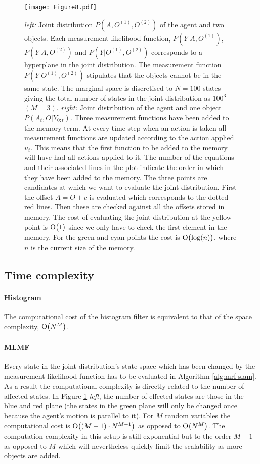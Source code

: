 \documentclass[review]{elsarticle}
\numberwithin{equation}{section}
\begin{document}
\begin{figure}
 \centering
  \texttt{[image: Figure8.pdf]}
  \caption{\textit{left:} Joint distribution $P(A,O^{(1)},O^{(2)})$ of the agent and two objects. Each measurement likelihood function, $P(Y|A,O^{(1)})$, 
  $P(Y|A,O^{(2)})$ and $P(Y|O^{(1)},O^{(2)})$ corresponds to a hyperplane in the joint distribution. The measurement function $P(Y|O^{(1)},O^{(2)})$ 
  stipulates that the objects cannot be in the same state. The marginal space is discretised to $N = 100$ states giving the total number of states in 
  the joint distribution as $100^3$ $(M=3)$. \textit{right:} Joint distribution of the agent and one object $P(A_t,O|Y_{0:t})$. Three measurement 
  functions have been added to the memory term. At every time step when an action is taken all measurement functions are updated according to 
  the action applied $u_t$. This means that the first function to be added to the memory will have had all actions applied to it. The number 
  of the equations and their associated lines in the plot indicate the order in which they have been added to the memory. 
  The three points are candidates at which we want to evaluate the joint distribution. First the offset $A=O+c$
  is evaluated which corresponds to the dotted red lines. Then these are checked against all the offsets stored in memory. The cost of evaluating
  the joint distribution at the yellow point is $\operatorname{O}\bigl(1\bigr)$ since we only have to check the first element in the memory. For the green and cyan points the 
  cost is $\operatorname{O}\bigl(\log(n)\bigr)$, where $n$ is the current size of the memory.}
  \label{fig:3bel_lik_profile}
\end{figure}

\subsection{Time complexity}

\paragraph{Histogram}
The computational cost of the histogram filter is equivalent to that of the space complexity, $\operatorname{O}\bigl( N^M \bigr)$.

\paragraph{MLMF}

Every state in the joint distribution's state space which has been changed by the measurement likelihood function has to be
evaluated in Algorithm \ref{alg:mrf-slam}. As a result the computational complexity is directly related to the number 
of affected states. In Figure \ref{fig:3bel_lik_profile} \textit{left}, the number of effected states are those in the blue
and red plane (the states in the green plane will only be changed once because the agent's motion is parallel to it).
For $M$ random variables the computational cost is $\operatorname{O}\bigl((M-1) \cdot N^{M-1}\bigr)$ as opposed to $\operatorname{O}\bigl( N^M \bigr)$. The computation complexity
in this setup is still exponential but to the order $M-1$ as opposed to $M$ which will nevertheless quickly limit the scalability as more objects are added. 
\end{document}
